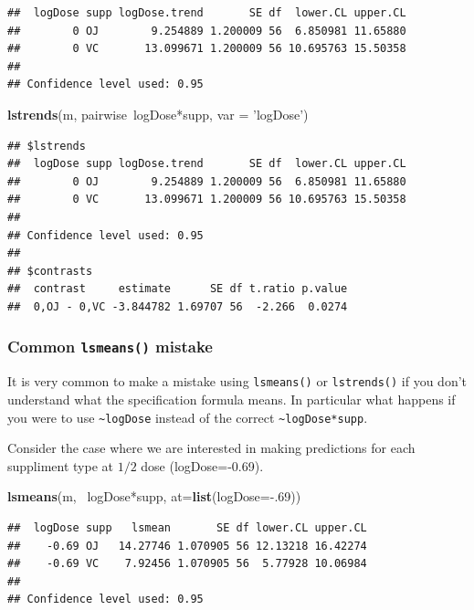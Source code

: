 \documentclass[]{book}
\newenvironment{Shaded}{\begin{snugshade}}{\end{snugshade}}
\newcommand{\KeywordTok}[1]{\textcolor[rgb]{0.13,0.29,0.53}{\textbf{{#1}}}}
\newcommand{\DataTypeTok}[1]{\textcolor[rgb]{0.13,0.29,0.53}{{#1}}}
\newcommand{\DecValTok}[1]{\textcolor[rgb]{0.00,0.00,0.81}{{#1}}}
\newcommand{\StringTok}[1]{\textcolor[rgb]{0.31,0.60,0.02}{{#1}}}
\newcommand{\NormalTok}[1]{{#1}}
\theoremstyle{definition}
\theoremstyle{definition}
\theoremstyle{remark}
\begin{document}
\begin{verbatim}
##  logDose supp logDose.trend       SE df  lower.CL upper.CL
##        0 OJ        9.254889 1.200009 56  6.850981 11.65880
##        0 VC       13.099671 1.200009 56 10.695763 15.50358
## 
## Confidence level used: 0.95
\end{verbatim}

\begin{Shaded}
\begin{Highlighting}[]
\KeywordTok{lstrends}\NormalTok{(m, pairwise~logDose*supp, }\DataTypeTok{var =} \StringTok{'logDose'}\NormalTok{)}
\end{Highlighting}
\end{Shaded}

\begin{verbatim}
## $lstrends
##  logDose supp logDose.trend       SE df  lower.CL upper.CL
##        0 OJ        9.254889 1.200009 56  6.850981 11.65880
##        0 VC       13.099671 1.200009 56 10.695763 15.50358
## 
## Confidence level used: 0.95 
## 
## $contrasts
##  contrast     estimate      SE df t.ratio p.value
##  0,OJ - 0,VC -3.844782 1.69707 56  -2.266  0.0274
\end{verbatim}

\subsubsection{\texorpdfstring{Common \texttt{lsmeans()}
mistake}{Common lsmeans() mistake}}\label{common-lsmeans-mistake}

It is very common to make a mistake using \texttt{lsmeans()} or
\texttt{lstrends()} if you don't understand what the specification
formula means. In particular what happens if you were to use
\texttt{\textasciitilde{}logDose} instead of the correct
\texttt{\textasciitilde{}logDose*supp}.

Consider the case where we are interested in making predictions for each
suppliment type at \(1/2\) dose (logDose=-0.69).

\begin{Shaded}
\begin{Highlighting}[]
\KeywordTok{lsmeans}\NormalTok{(m, ~logDose*supp, }\DataTypeTok{at=}\KeywordTok{list}\NormalTok{(}\DataTypeTok{logDose=}\NormalTok{-.}\DecValTok{69}\NormalTok{))}
\end{Highlighting}
\end{Shaded}

\begin{verbatim}
##  logDose supp   lsmean       SE df lower.CL upper.CL
##    -0.69 OJ   14.27746 1.070905 56 12.13218 16.42274
##    -0.69 VC    7.92456 1.070905 56  5.77928 10.06984
## 
## Confidence level used: 0.95
\end{verbatim}
\end{document}

